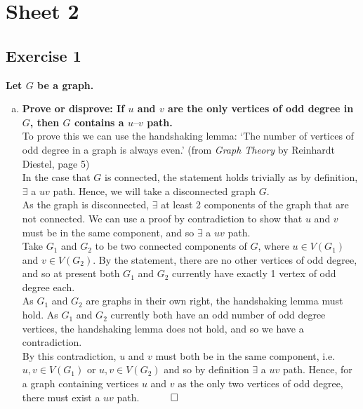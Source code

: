 \section*{Sheet 2}
\subsection*{Exercise 1}
\boldmath
\textbf{Let $G$ be a graph.}
\begin{enumerate}[a)]
    \item \textbf{Prove or disprove: If $u$ and $v$ are the only vertices of odd degree in $G$, then $G$ contains a $u–v$ path.} 
    \unboldmath
    \\
    \linebreak 
    To prove this we can use the handshaking lemma: ‘The number of vertices of odd degree in a graph is always even.’ (from \textit{Graph Theory} by Reinhardt Diestel, page 5)\\
    \linebreak 
    In the case that $G$ is connected, the statement holds trivially as by definition, $\exists$ a $uv$ path. Hence, we will take a disconnected graph $G$. \\
    \linebreak 
    As the graph is disconnected, $\exists $ at least 2 components of the graph that are not connected. We can use a proof by contradiction to show that $u$ and $v$ must be in the same component, and so $\exists$ a $uv$ path. \\
    \linebreak
    Take $G_1$ and $G_2$ to be two connected components of $G$, where $u \in V(G_1)$ and $v \in V(G_2)$. By the statement, there are no other vertices of odd degree, and so at present both $G_1$ and $G_2$ currently have exactly 1 vertex of odd degree each. \\
    \linebreak 
    As $G_1$ and $G_2$ are graphs in their own right, the handshaking lemma must hold. As $G_1$ and $G_2$ currently both have an odd number of odd degree vertices, the handshaking lemma does not hold, and so we have a contradiction. \\
    \linebreak 
    By this contradiction, $u$ and $v$ must both be in the same component, i.e. $u, v \in V(G_1)$ or $u, v \in V(G_2)$ and so by definition $\exists$ a $uv$ path. Hence, for a graph containing vertices $u$ and $v$ as the only two vertices of odd degree, there must exist a $uv$ path. $\hspace{10mm} \square$ \\

\end{enumerate}
